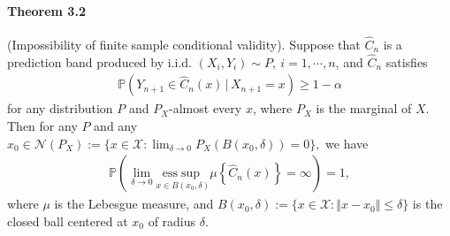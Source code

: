\documentclass{article}
\numberwithin{equation}{section}
\begin{document}
\paragraph{Theorem 3.2} (Impossibility of finite sample conditional validity). Suppose that $\widehat{C}_n$ is a prediction band produced by i.i.d. $(X_i,Y_i)\sim P,\ i=1,\cdots,n$, and $\widehat{C}_n$ satisfies
\begin{align*}
	\mathbb{P}\left(Y_{n+1}\in\widehat{C}_n(x)\,\big|\,X_{n+1}=x\right)\geq 1-\alpha\tag{3.10}
\end{align*}
for any distribution $P$ and $P_X$-almost every $x$, where $P_X$ is the marginal of $X$. Then for any $P$ and any $x_0\in\mathcal{N}(P_X):=\{x\in\mathcal{X}:\lim_{\delta\to 0}P_X(B(x_0,\delta))= 0\},$ we have
\begin{align*}
	\mathbb{P}\left(\lim_{\delta\to 0}\underset{x\in B(x_0,\delta)}{\mathrm{ess}\sup}\mu\left\{\widehat{C}_n(x)\right\}=\infty\right) = 1,\tag{3.11}\label{3.11}
\end{align*}
where $\mu$ is the Lebesgue measure, and $B(x_0,\delta):=\{x\in\mathcal{X}:\Vert x-x_0\Vert\leq\delta\}$ is the closed ball centered at $x_0$ of radius $\delta$.
\end{document}
